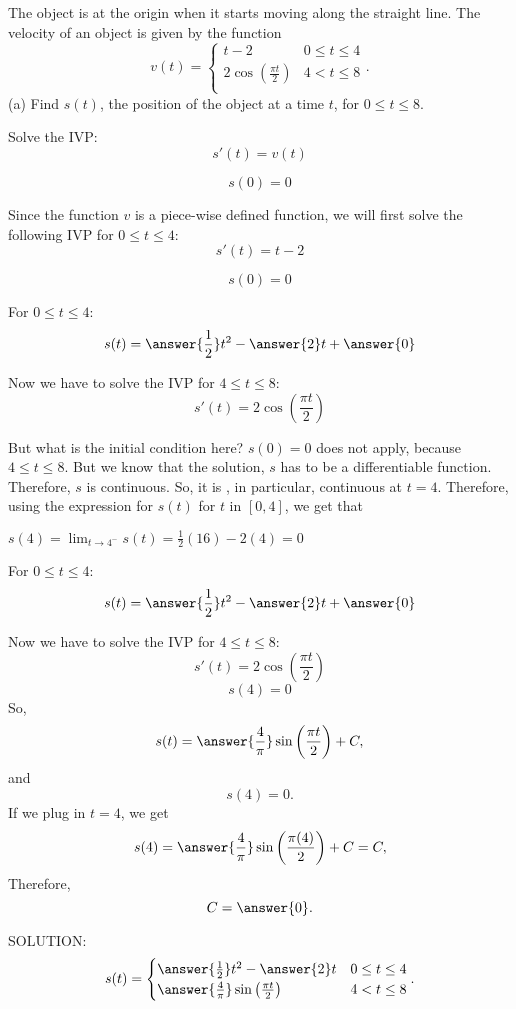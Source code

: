 \documentclass{ximera}
\author{Nela Lakos \and Kyle Parsons}
\begin{document}
\begin{exercise}

The object is at the origin when it starts moving along the straight line. The velocity of an object is given by the function
\[
v(t) = 
\begin{cases}
t-2 & 0\leq t\leq4\\
2\cos\left(\frac{\pi t}{2}\right) & 4<t\leq8\\
\end{cases}.
\]
(a) Find $s(t)$, the position of the object at a time $t$, for $0\leq t\leq8$.
\begin{hint}
Solve the IVP:
\[
s'(t) = v(t)
\]

\[
s(0) = 0
\]
\end{hint}
\begin{hint}
Since the function $v$ is a piece-wise defined function, we will first solve the following IVP for $0\leq t\leq4$:
\[
s'(t) =t-2
\]

\[
s(0) = 0
\]
\end{hint}
\begin{hint}
For $0\leq t\leq4$:
\[
s(t) =\answer{\frac{1}{2}}t^2-\answer{2}t+\answer{0}
\]
\end{hint}
\begin{hint}
Now we have to solve the IVP for $4\leq t\leq8$:
\[
s'(t) =2\cos\left(\frac{\pi t}{2}\right)
\]

But what is the initial condition here?
$s(0)=0$ does not apply, because $4\leq t\leq8$.
But we know that the solution, $s$ has to be a differentiable function.  Therefore, $s$ is continuous. So, it is , in particular, continuous at $t=4$.
Therefore, using the expression for $s(t)$ for $t$ in $[0,4]$, we get that

 $s(4)= \lim_{t\to 4^{-}}s(t)=
\frac{1}{2}(16)-2(4)=0$
\end{hint}
\begin{hint}
For $0\leq t\leq4$:
\[
s(t) =\answer{\frac{1}{2}}t^2-\answer{2}t+\answer{0}
\]
\end{hint}
\begin{hint}
Now we have to solve the IVP for $4\leq t\leq8$:
\[
s'(t) =2\cos\left(\frac{\pi t}{2}\right)
\]
\[
s(4) =0
\]
So, 
\[
s(t) =\answer{\frac{4}{\pi}}\sin\left(\frac{\pi t}{2}\right) +C,
\]
and
\[
s(4) =0.
\]
If we plug in $t=4$, we get
\[
s(4) =\answer{\frac{4}{\pi}}\sin\left(\frac{\pi (4)}{2}\right) +C=C,
\]
Therefore,
\[
C =\answer{0}.
\]
\end{hint}
SOLUTION:
\[
s(t) = 
\begin{cases}
\answer{\frac{1}{2}}t^2-\answer{2}t & 0\leq t\leq4\\


\answer{\frac{4}{\pi}}\sin\left(\frac{\pi t}{2}\right) & 4<t\leq8\\
\end{cases}.
\]

\end{exercise}
\end{document}
